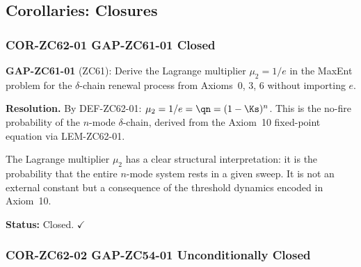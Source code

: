 \documentclass[12pt, a4paper]{article}
\begin{document}
\subsection{Corollaries: Closures}
\label{sec:cors}

\subsubsection{COR-ZC62-01 \quad GAP-ZC61-01 Closed}


\begin{formalbox}[title={COR-ZC62-01: GAP-ZC61-01 Closed ---
  $\mu_2 = 1/e$ from Axiom~10 ($R_0$)}]

\textbf{GAP-ZC61-01} (ZC61): Derive the Lagrange multiplier
$\mu_2 = 1/e$ in the MaxEnt problem for the $\delta$-chain
renewal process from Axioms~0, 3, 6 without importing $e$.

\medskip
\textbf{Resolution.}
By DEF-ZC62-01: $\mu_2 = 1/e = \qn = (1-\Ks)^n$.
This is the no-fire probability of the $n$-mode $\delta$-chain,
derived from the Axiom~10 fixed-point equation via LEM-ZC62-01.

The Lagrange multiplier $\mu_2$ has a clear structural
interpretation: it is the probability that the entire
$n$-mode system rests in a given sweep.
It is not an external constant but a consequence of the
threshold dynamics encoded in Axiom~10.

\textbf{Status:} Closed. $\checkmark$
\end{formalbox}

\subsubsection{COR-ZC62-02 \quad GAP-ZC54-01 Unconditionally Closed}

\end{document}
